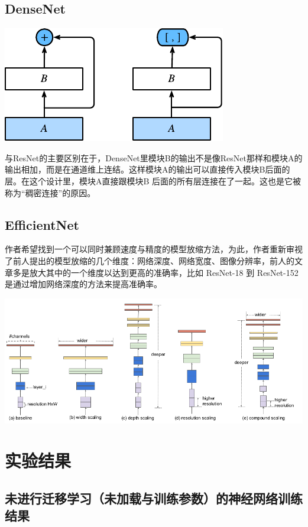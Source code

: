\documentclass[UTF8]{ctexart}
\begin{document}
\subsection{DenseNet}
\begin{center}
\includegraphics[scale=1]{densenet.pdf}
\end{center}

与ResNet的主要区别在于，DenseNet里模块B的输出不是像ResNet那样和模块A的输出相加，而是在通道维上连结。这样模块A的输出可以直接传入模块B后面的层。在这个设计里，模块A直接跟模块B
后面的所有层连接在了一起。这也是它被称为“稠密连接”的原因。
\subsection{EfficientNet}
\cite{tan2019efficientnet}
作者希望找到一个可以同时兼顾速度与精度的模型放缩方法，为此，作者重新审视了前人提出的模型放缩的几个维度：网络深度、网络宽度、图像分辨率，前人的文章多是放大其中的一个维度以达到更高的准确率，比如 ResNet-18 到 ResNet-152 是通过增加网络深度的方法来提高准确率。
\begin{center}
\includegraphics[scale=0.4]{efnet.png}
\end{center}
\newpage
\section{实验结果}
\subsection{未进行迁移学习（未加载与训练参数）的神经网络训练结果}
\end{document}

